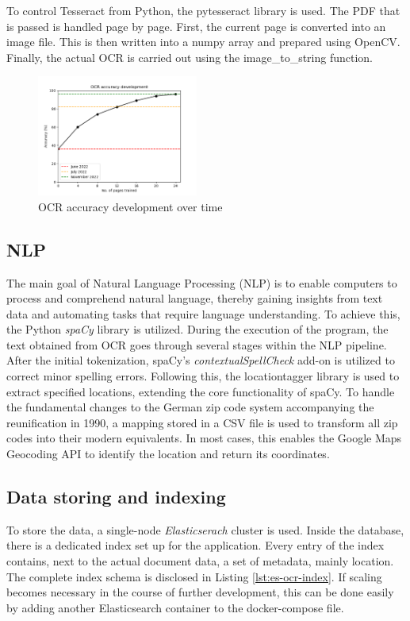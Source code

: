 \documentclass[12pt]{article}
\begin{document}
To control Tesseract from Python, the pytesseract library is used. The PDF that is passed is handled page by page. First, the current page is converted into an image file. This is then written into a numpy array and prepared using OpenCV. Finally, the actual OCR is carried out using the image\_to\_string function.

\begin{figure}
    \centering
    \includegraphics[width=200px]{ocr-accuracy.png}
    \caption{OCR accuracy development over time}
    \label{fig:ocr-accuracy}
\end{figure}

\subsection{NLP}
\label{ssec:nlp}

The main goal of Natural Language Processing (NLP) is to enable computers to process and comprehend natural language, thereby gaining insights from text data and automating tasks that require language understanding. To achieve this, the Python \textit{spaCy} library is utilized. During the execution of the program, the text obtained from OCR goes through several stages within the NLP pipeline. After the initial tokenization, spaCy's \textit{contextualSpellCheck} add-on is utilized to correct minor spelling errors. Following this, the locationtagger library is used to extract specified locations, extending the core functionality of spaCy. To handle the fundamental changes to the German zip code system accompanying the reunification in 1990, a mapping stored in a CSV file is used to transform all zip codes into their modern equivalents. In most cases, this enables the Google Maps Geocoding API to identify the location and return its coordinates.

\subsection{Data storing and indexing}
\label{ssec:database}

To store the data, a single-node \textit{Elasticserach} cluster is used. Inside the database, there is a dedicated index set up for the application. Every entry of the index contains, next to the actual document data, a set of metadata, mainly location. The complete index schema is disclosed in Listing \ref{lst:es-ocr-index}. If scaling becomes necessary in the course of further development, this can be done easily by adding another Elasticsearch container to the docker-compose file.
\end{document}
